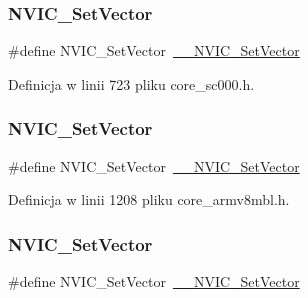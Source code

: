 \subsubsection{\texorpdfstring{N\+V\+I\+C\+\_\+\+Set\+Vector}{NVIC\_SetVector}\hspace{0.1cm}{\footnotesize\ttfamily [4/12]}}
{\footnotesize\ttfamily \#define N\+V\+I\+C\+\_\+\+Set\+Vector~\hyperlink{group___c_m_s_i_s___core___n_v_i_c_functions_ga0df355460bc1783d58f9d72ee4884208}{\+\_\+\+\_\+\+N\+V\+I\+C\+\_\+\+Set\+Vector}}



Definicja w linii 723 pliku core\+\_\+sc000.\+h.

\mbox{\label{group___c_m_s_i_s___core___n_v_i_c_functions_ga804af63bb4c4c317387897431814775d}} 
\subsubsection{\texorpdfstring{N\+V\+I\+C\+\_\+\+Set\+Vector}{NVIC\_SetVector}\hspace{0.1cm}{\footnotesize\ttfamily [5/12]}}
{\footnotesize\ttfamily \#define N\+V\+I\+C\+\_\+\+Set\+Vector~\hyperlink{group___c_m_s_i_s___core___n_v_i_c_functions_ga0df355460bc1783d58f9d72ee4884208}{\+\_\+\+\_\+\+N\+V\+I\+C\+\_\+\+Set\+Vector}}



Definicja w linii 1208 pliku core\+\_\+armv8mbl.\+h.

\mbox{\label{group___c_m_s_i_s___core___n_v_i_c_functions_ga804af63bb4c4c317387897431814775d}} 
\subsubsection{\texorpdfstring{N\+V\+I\+C\+\_\+\+Set\+Vector}{NVIC\_SetVector}\hspace{0.1cm}{\footnotesize\ttfamily [6/12]}}
{\footnotesize\ttfamily \#define N\+V\+I\+C\+\_\+\+Set\+Vector~\hyperlink{group___c_m_s_i_s___core___n_v_i_c_functions_ga0df355460bc1783d58f9d72ee4884208}{\+\_\+\+\_\+\+N\+V\+I\+C\+\_\+\+Set\+Vector}}



